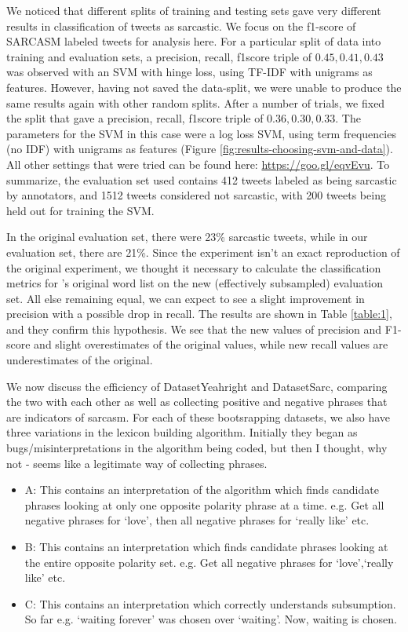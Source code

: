 \documentclass[11pt]{article}
\begin{document}
We noticed that different splits of training and testing sets gave very different results in classification of tweets as sarcastic. We focus on the f1-score of SARCASM labeled tweets for analysis here. For a particular split of data into training and evaluation sets, a precision, recall, f1score triple of \(0.45, 0.41, 0.43\) was observed with an SVM with hinge loss, using TF-IDF with unigrams as features. However, having not saved the data-split, we were unable to produce the same results again with other random splits. After a number of trials, we fixed the split that gave a precision, recall, f1score triple of \(0.36, 0.30, 0.33\). The parameters for the SVM in this case were a log loss SVM, using term frequencies (no IDF) with unigrams as features (Figure \ref{fig:results-choosing-svm-and-data}). All other settings that were tried can be found here: \url{https://goo.gl/eqvEvu}. To summarize, the evaluation set used contains 412 tweets labeled as being sarcastic by annotators, and 1512 tweets considered not sarcastic, with 200 tweets being held out for training the SVM.

In the original evaluation set, there were 23\% sarcastic tweets, while in our evaluation set, there are 21\%. Since the experiment isn't an exact reproduction of the original experiment, we thought it necessary to calculate the classification metrics for \cite{riloff2013sarcasm}'s original word list on the new (effectively subsampled) evaluation set. All else remaining equal, we can expect to see a slight improvement in precision with a possible drop in recall. The results are shown in Table \ref{table:1}, and they confirm this hypothesis. We see that the new values of precision and F1-score and slight overestimates of the original values, while new recall values are underestimates of the original.

We now discuss the efficiency of DatasetYeahright and DatasetSarc, comparing the two with each other as well as collecting positive and negative phrases that are indicators of sarcasm. For each of these bootsrapping datasets, we also have three variations in the lexicon building algorithm. Initially they began as bugs/misinterpretations in the algorithm being coded, but then I thought, why not - seems like a legitimate way of collecting phrases. 
\begin{itemize}
\item A:  This contains an interpretation of the algorithm which finds candidate phrases looking at only one opposite polarity phrase at a time. e.g. Get all negative phrases for `love', then all negative phrases for `really like' etc.
\item B: This contains an interpretation which finds candidate phrases looking at the entire opposite polarity set. e.g. Get all negative phrases for {`love',`really like'} etc. 
\item C: This contains an interpretation which correctly understands subsumption. So far e.g. `waiting forever' was chosen over `waiting'. Now, waiting is chosen.  
\end{itemize}
\end{document}
